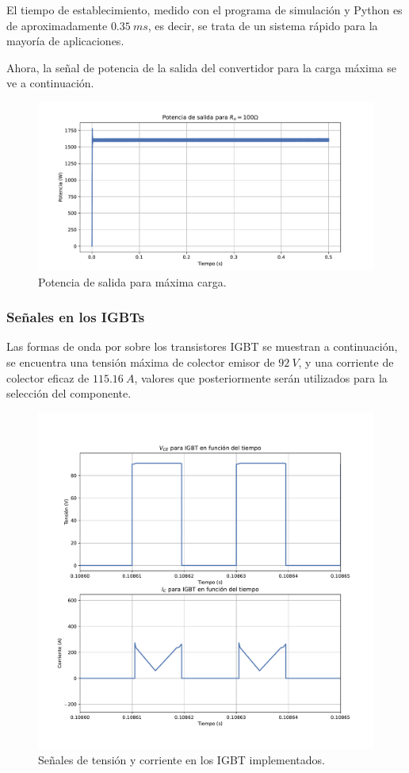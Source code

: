 El tiempo de establecimiento, medido con el programa de simulación y Python es de aproximadamente $0.35 \ ms$, es decir, se trata de un sistema rápido para la mayoría de aplicaciones.


Ahora, la señal de potencia de la salida del convertidor para la carga máxima se ve a continuación.

\begin{figure}
	\centering
	\includegraphics[width=1\linewidth]{img/potencia}
	\caption{Potencia de salida para máxima carga.}
	\label{fig:potencia}
\end{figure}

\subsubsection{Señales en los IGBTs}

Las formas de onda por sobre los transistores IGBT se muestran a continuación, se encuentra una tensión máxima de colector emisor de $92 \ V$, y una corriente de colector eficaz de $115.16 \ A$, valores que posteriormente serán utilizados para la selección del componente.

\begin{figure}
	\centering
	\includegraphics[width=1\linewidth]{img/signal_IGBT}
	\caption{Señales de tensión y corriente en los IGBT implementados.}
	\label{fig:signaligbt}
\end{figure}

